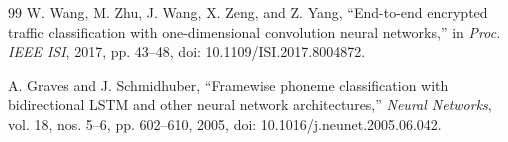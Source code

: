 \documentclass[letterpaper,journal]{IEEEtran}
\begin{document}
\begin{thebibliography}{99}
W. Wang, M. Zhu, J. Wang, X. Zeng, and Z. Yang, ``End-to-end encrypted traffic classification with
one-dimensional convolution neural networks,'' in \emph{Proc. IEEE ISI},
2017, pp. 43--48, doi: 10.1109/ISI.2017.8004872.

A. Graves and J. Schmidhuber, ``Framewise phoneme classification with
bidirectional LSTM and other neural network architectures,'' \emph{Neural
Networks}, vol. 18, nos. 5--6, pp. 602--610, 2005,
doi: 10.1016/j.neunet.2005.06.042.

%
%
%
%

\end{thebibliography}
\end{document}
